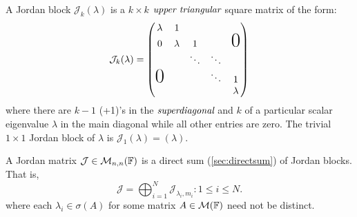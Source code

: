 \begin{defn}
	A Jordan block $\mathcal{J}_k(\lambda)$ is a $k \times k$
	$\emph{upper triangular}$ square matrix of the form:
	\[
		\mathcal{J}_k(\lambda) =
		\begin{pmatrix}
			\lambda & 1 & & & \\
			0 & \lambda & 1 & & \text{\huge{0}} \\
			& & \ddots & \ddots & \\
			\text{\huge{0}} & & & \ddots & 1 \\
			& & & & \lambda
		\end{pmatrix}
	\]
	where there are $k-1$ (+1)'s in the $\emph{superdiagonal}$ and
	$k$ of a particular scalar eigenvalue $\lambda$ in the main
	diagonal while all other entries are zero. The trivial $1 \times 1$
	Jordan block of $\lambda$ is $\mathcal{J}_1(\lambda) = ( \lambda )$.
\end{defn}

\begin{defn}
	A Jordan matrix $\mathcal{J} \in \mathcal{M}_{n,n}(\mathbb{F})$ is a
	direct sum (\ref{sec:directsum}) of Jordan blocks. That is,
	\[
		\mathcal{J} =
		\bigoplus_{i=1}^{N} \mathcal{J}_{\lambda_i , m_i} : 1 \leq i \leq N.
	\]
	where each $\lambda_i \in \sigma(A)$ for some matrix $A \in \mathcal{M}(\mathbb{F})$
	need not be distinct.
\end{defn}

